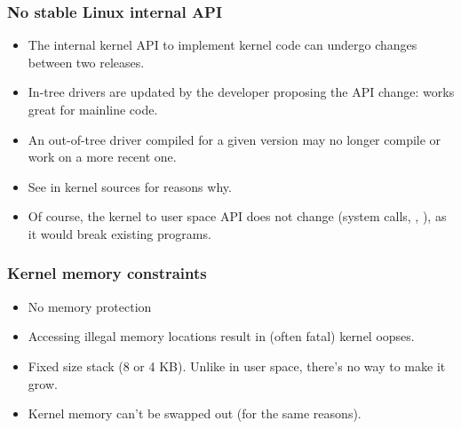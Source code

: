 \begin{frame}
  \frametitle{No stable Linux internal API}
  \begin{itemize}
  \item The internal kernel API to implement kernel code can undergo
    changes between two releases.
  \item In-tree drivers are updated by the developer proposing the API
    change: works great for mainline code.
  \item An out-of-tree driver compiled for a given version may no
    longer compile or work on a more recent one.
  \item See  in kernel sources for
    reasons why.
  \item Of course, the kernel to user space API does not change (system
    calls, , ), as it would break existing
    programs.
  \end{itemize}
\end{frame}

\begin{frame}
  \frametitle{Kernel memory constraints}
  \begin{itemize}
  \item No memory protection
  \item Accessing illegal memory locations result in (often fatal)
    kernel oopses.
  \item Fixed size stack (8 or 4 KB). Unlike in user space, there's no
    way to make it grow.
  \item Kernel memory can't be swapped out (for the same reasons).
  \end{itemize}
\end{frame}

